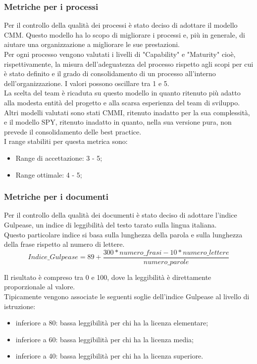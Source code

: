 	\subsubsection{Metriche per i processi}
		Per il controllo della qualità dei processi è stato deciso di adottare il modello CMM. Questo modello ha lo scopo di migliorare i processi e, più in generale, di aiutare una organizzazione a migliorare le sue prestazioni.\\
		Per ogni processo vengono valutati i livelli di "Capability" e "Maturity" cioè, rispettivamente, la misura dell'adeguatezza del processo  rispetto agli scopi per cui è stato definito e il grado di consolidamento di un processo all'interno dell'organizzazione. I valori possono oscillare tra 1 e 5.\\
		La scelta del team è ricaduta su questo modello in quanto ritenuto più adatto alla modesta entità del progetto e alla scarsa esperienza del team di sviluppo. Altri modelli valutati sono stati CMMI, ritenuto inadatto per la sua complessità, e il modello SPY, ritenuto inadatto in quanto, nella sua versione pura, non prevede il consolidamento delle best practice.\\
		I range stabiliti per questa metrica sono:
		\begin{itemize}
			\item Range di accettazione: 3 - 5;
			\item Range ottimale: 4 - 5;
		\end{itemize}	
	\subsubsection{Metriche per i documenti}
		Per il controllo della qualità dei documenti è stato deciso di adottare l'indice Gulpease, un indice di leggibilità del testo tarato sulla lingua italiana.\\
		Questo particolare indice si basa sulla lunghezza della parola e sulla lunghezza della frase rispetto al numero di lettere.\\
		
		\begin{equation}\label{Indice Gulpease}
		Indice\_Gulpease = 89+ \frac{300*numero\_frasi-10*numero\_lettere}{numero\_parole}
		\end{equation}
			
		Il risultato è compreso tra 0 e 100, dove la leggibilità è direttamente proporzionale al valore.\\
		Tipicamente vengono associate le seguenti soglie dell'indice Gulpease al livello di istruzione:
		\begin{itemize}
			\item inferiore a 80: bassa leggibilità per chi ha la licenza elementare;
			\item inferiore a 60: bassa leggibilità per chi ha la licenza media;
			\item inferiore a 40: bassa leggibilità per chi ha la licenza superiore.
		\end{itemize}
		
